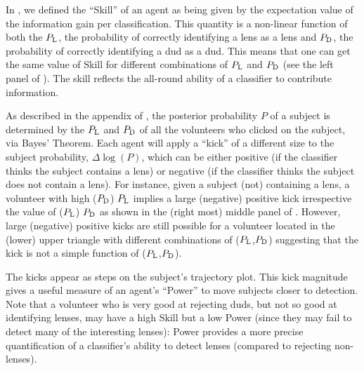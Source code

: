 \documentclass[useAMS,usenatbib,a4paper]{mn2e}
\begin{document}
In \PaperOne, we defined the ``Skill'' of an agent as being given by the
expectation value of the information gain per classification. This
quantity is a non-linear function of both the $P_{\rm L}$, the
probability of correctly identifying a lens as a lens and $P_{\rm D}$,
the probability of correctly identifying a dud as a dud. This means that
one can get the same value of Skill for different combinations of
$P_{\rm L}$ and $P_{\rm D}$ (see the left panel of
). The skill reflects the all-round ability of a
classifier to contribute information.

As described in the appendix of \PaperOne, the posterior probability $P$
of a subject is determined by the $P_{\rm L}$ and $P_{\rm D}$ of all the
volunteers who clicked on the subject, via Bayes' Theorem. Each agent
will apply a ``kick'' of a different size to the subject probability,
$\Delta\log(P)$, which can be either positive (if the classifier thinks
the subject contains a lens) or negative (if the classifier thinks the
subject does not contain a lens). For instance, given a subject
(not) containing a lens, a volunteer with high ($P_{\rm D}$) $P_{\rm L}$
implies a large (negative) positive kick irrespective the value of
($P_{\rm L}$) $P_{\rm D}$ as shown in the (right most) middle panel of
. However, large (negative) positive kicks are
still possible for a volunteer located in the (lower) upper triangle
with different combinations of ($P_{\rm L}$,$P_{\rm D}$) suggesting that
the kick is not a simple function of ($P_{\rm L}$,$P_{\rm D}$).

The kicks appear as steps on the subject's trajectory plot. This kick
magnitude gives a useful measure of an agent's ``Power'' to move
subjects closer to detection.  Note that a volunteer who is very good at
rejecting duds, but not so good at identifying lenses, may have a high
Skill but a low Power (since they may fail to detect many of the
interesting lenses): Power provides a more precise quantification of a
classifier's ability to detect lenses (compared to rejecting non-lenses).
\end{document}
